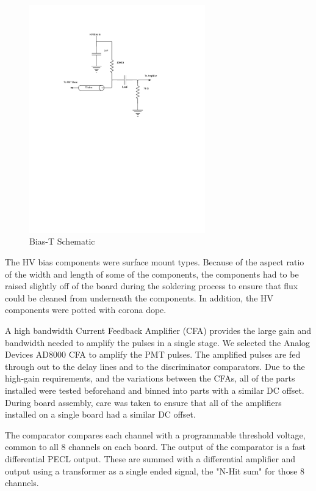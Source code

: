 \documentclass[preprint,12pt]{elsarticle}
\begin{document}
\begin{figure}[h]
\begin{center}
\includegraphics[width=3in, keepaspectratio=true, trim=1.5in 5.5in 2in 1.25in, clip=true]{graphics/bias}
\caption{Bias-T Schematic}
\label{fig:bias}
\end{center}
\end{figure}

The HV bias components were surface mount types.  Because of the aspect ratio of the width and length of some of the components, the components had to be raised slightly off of the board during the soldering process to ensure that flux could be cleaned from underneath the components.  In addition, the HV components were potted with corona dope.

A high bandwidth Current Feedback Amplifier (CFA) provides the large gain and bandwidth needed to amplify the pulses in a single stage.  We selected the Analog Devices AD8000 CFA to amplify the PMT pulses.  The amplified pulses are fed through out to the delay lines and to the discriminator comparators.  Due to the high-gain requirements, and the variations between the CFAs, all of the parts installed were tested beforehand and binned into parts with a similar DC offset.  During board assembly, care was taken to ensure that all of the amplifiers installed on a single board had a similar DC offset.

The comparator compares each channel with a programmable threshold voltage, common to all 8 channels on each board.  The output of the comparator is a fast differential PECL output.  These are summed with a differential amplifier and output using a transformer as a single ended signal, the "N-Hit sum" for those 8 channels.
\end{document}
